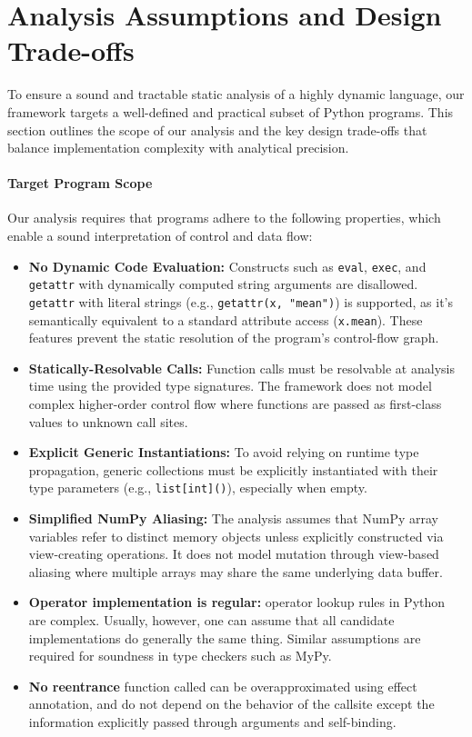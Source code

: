 \clearpage
\appendix
\section{Analysis Assumptions and Design Trade-offs}
\label{sec:appendix-assumptions}

To ensure a sound and tractable static analysis of a highly dynamic language, our framework targets a well-defined and practical subset of Python programs. This section outlines the scope of our analysis and the key design trade-offs that balance implementation complexity with analytical precision.

\paragraph{Target Program Scope}
Our analysis requires that programs adhere to the following properties, which enable a sound interpretation of control and data flow:
\begin{itemize}
    \item \textbf{No Dynamic Code Evaluation:} Constructs such as \texttt{eval}, \texttt{exec}, and \texttt{getattr} with dynamically computed string arguments are disallowed. \texttt{getattr} with literal strings (e.g., \texttt{getattr(x, "mean")}) is supported, as it's semantically equivalent to a standard attribute access (\texttt{x.mean}). These features prevent the static resolution of the program's control-flow graph.
    \item \textbf{Statically-Resolvable Calls:} Function calls must be resolvable at analysis time using the provided type signatures. The framework does not model complex higher-order control flow where functions are passed as first-class values to unknown call sites.
    \item \textbf{Explicit Generic Instantiations:} To avoid relying on runtime type propagation, generic collections must be explicitly instantiated with their type parameters (e.g., \texttt{list[int]()}), especially when empty.
    \item \textbf{Simplified NumPy Aliasing:} The analysis assumes that NumPy array variables refer to distinct memory objects unless explicitly constructed via view-creating operations. It does not model mutation through view-based aliasing where multiple arrays may share the same underlying data buffer.
    \item \textbf{Operator implementation is regular:} operator lookup rules in Python are complex. Usually, however, one can assume that all candidate implementations do generally the same thing. Similar assumptions are required for soundness in type checkers such as MyPy.
    \item \textbf{No reentrance} function called can be overapproximated using effect annotation, and do not depend on the behavior of the callsite except the information explicitly passed through arguments and self-binding.
\end{itemize}

